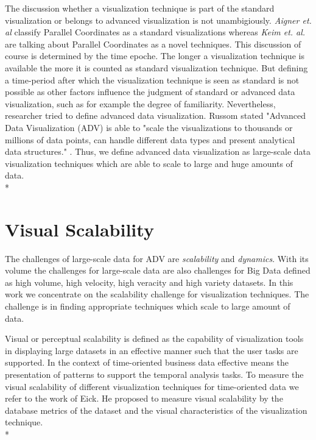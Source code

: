  The discussion whether a visualization technique is part of the standard visualization or belongs to advanced visualization is not unambigiously. \textit{Aigner et. al} classify Parallel Coordinates as a standard visualizations\cite{Aigner2011} whereas \textit{Keim et. al.} \cite{Keim} are talking about Parallel Coordinates as a novel techniques. This discussion of course is determined by the time epoche. The longer a visualization technique is available the more it is counted as standard visualization technique. But defining a time-period after which the visualization technique is seen as standard is not possible as other factors influence the judgment of standard or advanced data visualization, such as for example the degree of familiarity. Nevertheless, researcher tried to define advanced data visualization. Russom stated "Advanced Data Visualization (ADV) is able to "scale the visualizations to thousands or millions of data points, can handle different data types and present analytical data structures." \cite{Russom2011}. Thus, we define advanced data visualization as large-scale data visualization techniques which are able to scale to large and huge amounts of data. 
 \\*
\section{Visual Scalability}
 The challenges of large-scale data for ADV are \textit{scalability} and \textit{dynamics}\cite{Wang2015}. With its volume the challenges for large-scale data are also challenges for Big Data defined as high volume, high velocity, high veracity and high variety datasets\cite{Wang2015}. In this work we concentrate on the scalability challenge for visualization techniques. The challenge is in finding appropriate techniques\cite{Aigner2008,Keim2005} which scale to large amount of data.
 
Visual or perceptual scalability is defined as the capability of visualization tools in displaying large datasets in an effective manner\cite{Eick2002} such that the user tasks are supported. In the context of time-oriented business data effective means the presentation of patterns to support the temporal analysis tasks. To measure the visual scalability of different visualization techniques for time-oriented data we refer to the work of Eick\cite{Eick2002}. He proposed to measure visual scalability by the database metrics of the dataset and the visual characteristics of the visualization technique.\\*

